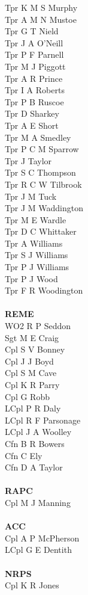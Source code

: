 \begin{multicols}{3}
  Tpr K M S Murphy \\
  Tpr A M N Mustoe \\
  Tpr G T Nield \\
  Tpr J A O'Neill \\
  Tpr P F Parnell \\
  Tpr M J Piggott \\
  Tpr A R Prince \\
  Tpr I A Roberts \\
  Tpr P B Ruscoe \\
  Tpr D Sharkey \\
  Tpr A E Short \\
  Tpr M A Smedley \\
  Tpr P C M Sparrow \\
  Tpr J Taylor \\
  Tpr S C Thompson \\
  Tpr R C W Tilbrook \\
  Tpr J M Tuck \\
  Tpr J M Waddington \\
  Tpr M E Wardle \\
  Tpr D C Whittaker \\
  Tpr A Williams \\
  Tpr S J Williams \\
  Tpr P J Williams \\
  Tpr P J Wood \\
  Tpr F R Woodington \\
  \\
  \textbf{REME} \\
  WO2 R P Seddon \\
  Sgt M E Craig \\
  Cpl S V Bonney \\
  Cpl J J Boyd \\
  Cpl S M Cave \\
  Cpl K R Parry \\
  Cpl G Robb \\
  LCpl P R Daly \\
  LCpl R F Parsonage \\
  LCpl J A Woolley \\
  Cfn B R Bowers \\
  Cfn C Ely \\
  Cfn D A Taylor \\
  \\
  \textbf{RAPC} \\
  Cpl M J Manning \\
  \\
  \textbf{ACC} \\
  Cpl A P McPherson \\
  LCpl G E Dentith \\
  \\
  \textbf{NRPS} \\
  Cpl K R Jones \\
\end{multicols}

